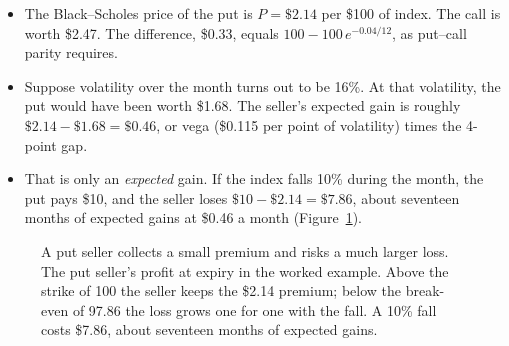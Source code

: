 \begin{itemize}
  \item The Black--Scholes price of the put is $P = \$2.14$ per \$100 of index. The call is worth \$2.47. The difference, \$0.33, equals $100 - 100\,e^{-0.04/12}$, as put--call parity requires.
  \item Suppose volatility over the month turns out to be 16\%. At that volatility, the put would have been worth \$1.68. The seller's expected gain is roughly $\$2.14 - \$1.68 = \$0.46$, or vega (\$0.115 per point of volatility) times the 4-point gap.
  \item That is only an \emph{expected} gain. If the index falls 10\% during the month, the put pays \$10, and the seller loses $\$10 - \$2.14 = \$7.86$, about seventeen months of expected gains at \$0.46 a month (Figure~\ref{fig:16-put}).
\end{itemize}

\begin{figure}[htbp]
\centering
{}
\caption{A put seller collects a small premium and risks a much larger loss. The put seller's profit at expiry in the worked example. Above the strike of 100 the seller keeps the \$2.14 premium; below the break-even of 97.86 the loss grows one for one with the fall. A 10\% fall costs \$7.86, about seventeen months of expected gains.}
\label{fig:16-put}
\end{figure}

